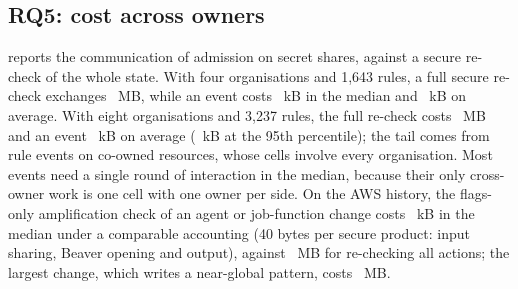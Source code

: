 \begin{table}[t]
\centering\small
\caption{Share of events (\%) that introduce at least one finding of each type, by event type (ten seeds, \eOneEvents{} events).}\label{tab:held}
\end{table}

\subsection{RQ5: cost across owners}\label{sec:costeval}
 reports the communication of admission on secret shares, against a secure re-check of the whole state. With four organisations and 1,643 rules, a full secure re-check exchanges \secMidFull~MB, while an event costs \secMidMed~kB in the median and \secMidMean~kB on average. With eight organisations and 3,237 rules, the full re-check costs \secBigFull~MB and an event \secBigMean~kB on average (\secBigPnf~kB at the 95th percentile); the tail comes from rule events on co-owned resources, whose cells involve every organisation. Most events need a single round of interaction in the median, because their only cross-owner work is one cell with one owner per side. On the AWS history, the flags-only amplification check of an agent or job-function change costs \awsSecKBMed~kB in the median under a comparable accounting (40 bytes per secure product: input sharing, Beaver opening and output), against \awsSecFullMBMed~MB for re-checking all actions; the largest change, which writes a near-global pattern, costs \awsSecMBMax~MB.

\begin{table}[t]
\centering\small
\caption{Communication of admission across owners on constructed federations (100 events each): full secure re-check of the state against one event. kB and MB of $10^3$ and $10^6$ bytes; ratio: full re-check over mean event.}\label{tab:secure}
\end{table}

